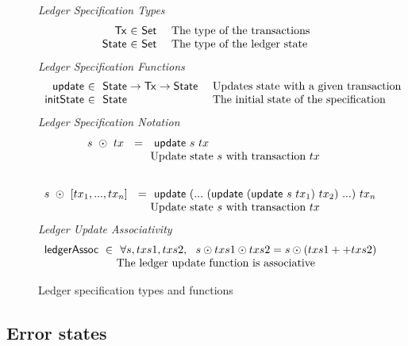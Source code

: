 \begin{figure*}[htb]
  \emph{Ledger Specification Types}
  \begin{equation*}
    \begin{array}{r@{~\in~}l@{~~~~}lr}
      \Tx
      & \Set
      & \text{The type of the transactions} \\
      \State
      & \Set
      & \text{The type of the ledger state} \\
    \end{array}
  \end{equation*}
  \emph{Ledger Specification Functions}
  \begin{equation*}
    \begin{array}{r@{~\in~}l@{~~~~}lr}
    \ups & ~\type{State} \to \type{Tx} \to \type{State}
    & \text{Updates state with a given transaction} \\
    \fun{initState} & ~\type{State}
    & \text{The initial state of the specification} \\
    \end{array}
  \end{equation*}
  \emph{Ledger Specification Notation}
  \begin{equation*}
    \begin{array}{r@{~}l@{~~~~}lr}
    s~\odot~tx~ ~=~&~ \ups~s~tx  \\
    & \text{Update state $s$ with transaction $tx$} \\
    \nextdef
    s~\odot~[tx_1, ... , tx_n]~~= &~ \ups~(...~ (\ups~(\ups~s~tx_1)~tx_2) ~...)~ tx_n \\
    & \text{Update state $s$ with transaction $tx$} \\
    \end{array}
  \end{equation*}
  \emph{Ledger Update Associativity}
  \begin{equation*}
    \begin{array}{r@{}l@{~~~~}lr}
    \fun{ledgerAssoc}~\in~&~ \forall s, txs1, txs2,~~s \odot txs1 \odot txs2 = s \odot (txs1 ++ txs2)  \\
    & \text{The ledger update function is associative} \\
    \end{array}
  \end{equation*}
  \caption{Ledger specification types and functions}
  \label{fig:ledger-spec}
\end{figure*}

\subsection{Error states}
\label{sec:errors}

